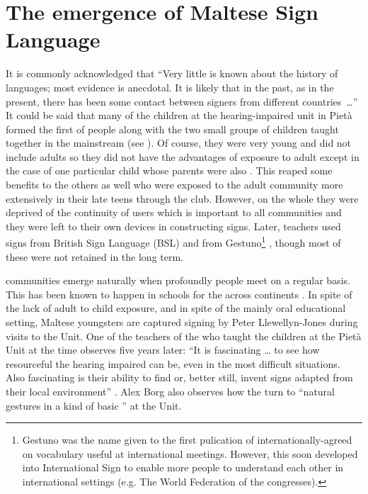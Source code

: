 \documentclass[output=paper]{langsci/langscibook}
\begin{document}
\section{The emergence of Maltese Sign Language}

It is commonly acknowledged that “Very little is known about the
history of  languages; most evidence is anecdotal.  It is likely
that in the past, as in the present, there has been some contact
between signers from different countries~{\dots}” \citep[81]{woll84} It
could be said that many of the  children at the hearing-impaired
unit in Pietà formed the first  of  people along
with the two small groups of children taught together in the
mainstream (see ).  Of course, they were very young and did not
include  adults so they did not have the advantages of exposure to
adult  except in the case of one particular child whose
parents were also .  This reaped some benefits to the others as
well who were exposed to the adult  community more extensively in
their late teens through the  club.  However, on the whole they
were deprived of the continuity of  users which is
important to all  communities and they were left to their own
devices in constructing signs.  Later, teachers used signs from
British Sign Language (BSL) and from Gestuno\footnote{Gestuno was the
  name given to the first pulication of internationally-agreed on 
  vocabulary useful at international meetings.  However, this soon
  developed into International Sign to enable more  people to
  understand each other in international settings (e.g. The World
  Federation of the  congresses).}
\citep{lj86}, though most of these were not
retained in the long term.

 communities emerge naturally when profoundly  people meet on
a regular basis.  This has been known to happen in schools for the
 across continents \citep{rr05}. In spite of
the lack of adult to child  exposure, and in spite of the
mainly oral educational setting, Maltese  youngsters are captured
signing by Peter Llewellyn-Jones during visits to the  Unit.  One
of the teachers of the  who taught the children at the Pietà 
Unit at the time observes five years later: “It is fascinating {\dots} to
see how resourceful the hearing impaired can be, even in the most
difficult situations.  Also fascinating is their ability to find or,
better still, invent signs adapted from their local environment”
\citep[50]{ba91}. Alex Borg also observes how the 
turn to “natural gestures in a kind of basic ” at the
 Unit.
\end{document}
